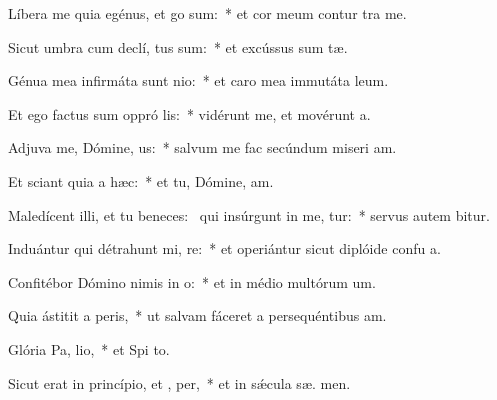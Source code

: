 \item Líbera me quia egénus, et  go sum:~* et cor meum contur  tra me.
\item Sicut umbra cum declí, tus sum:~* et excússus sum  tæ.
\item Génua mea infirmáta sunt  nio:~* et caro mea immutáta   leum.
\item Et ego factus sum oppró lis:~* vidérunt me, et movérunt  a.
\item Adjuva me, Dómine,  us:~* salvum me fac secúndum miseri am.
\item Et sciant quia  a hæc:~* et tu, Dómine,  am.
\item Maledícent illi, et tu beneces:~\pscross{} qui insúrgunt in me, tur:~* servus autem  bitur.
\item Induántur qui détrahunt mi, re:~* et operiántur sicut diplóide confu a.
\item Confitébor Dómino nimis in  o:~* et in médio multórum  um.
\item Quia ástitit a  peris,~* ut salvam fáceret a persequéntibus  am.
\item Glória Pa,  lio,~* et Spi to.
\item Sicut erat in princípio, et ,  per,~* et in sǽcula sæ. men.
